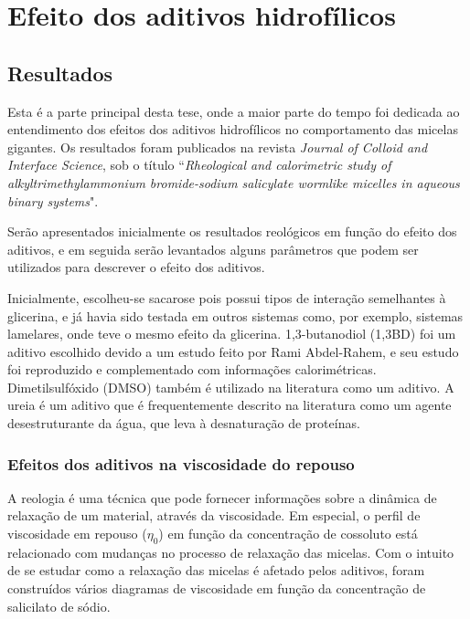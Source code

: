 \part{Efeito dos aditivos hidrofílicos}
	\label{sec:efeito_aditivos_hidrofilicos} 


	
	\chapter{Resultados}
		
	Esta é a parte principal desta tese, onde a maior parte do tempo foi dedicada ao entendimento dos efeitos dos aditivos hidrofílicos no comportamento das micelas gigantes. Os resultados foram publicados na revista \emph{Journal of Colloid and Interface Science}, sob o título ``\emph{Rheological and calorimetric study of alkyltrimethylammonium bromide-sodium salicylate wormlike micelles in aqueous binary systems}"\cite{Clinckspoor2018}.
	
	Serão apresentados inicialmente os resultados reológicos em função do efeito dos aditivos, e em seguida serão levantados alguns parâmetros que podem ser utilizados para descrever o efeito dos aditivos.
	
	Inicialmente, escolheu-se sacarose pois possui tipos de interação semelhantes à glicerina, e já havia sido testada em outros sistemas como, por exemplo, sistemas lamelares, onde teve o mesmo efeito da glicerina. 1,3-butanodiol (1,3BD) foi um aditivo escolhido devido a um estudo feito por Rami Abdel-Rahem, e seu estudo foi reproduzido e complementado com informações calorimétricas. Dimetilsulfóxido (DMSO) também é utilizado na literatura como um aditivo. A ureia é um aditivo que é frequentemente descrito na literatura como um agente desestruturante da água, que leva à desnaturação de proteínas. 	%
	
		\section{Efeitos dos aditivos na viscosidade do repouso} 
			
			A reologia é uma técnica que pode fornecer informações sobre a dinâmica de relaxação de um material, através da viscosidade. Em especial, o perfil de viscosidade em repouso (\(\eta_0\)) em função da concentração de cossoluto está relacionado com mudanças no processo de relaxação das micelas. Com o intuito de se estudar como a relaxação das micelas é afetado pelos aditivos, foram construídos vários diagramas de viscosidade em função da concentração de salicilato de sódio.
			

